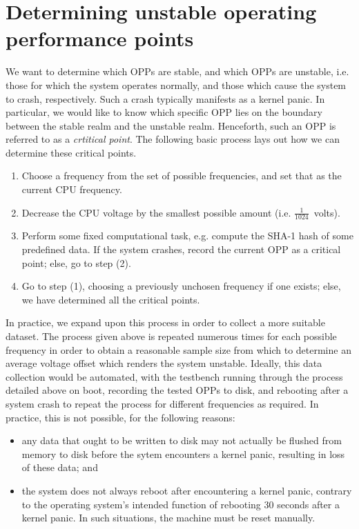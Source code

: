 \section{Determining unstable operating performance points}
\label{sec:unstableOPPs}

We want to determine which OPPs are stable, and which OPPs are unstable, i.e.
those for which the system operates normally, and those which cause the system
to crash, respectively. Such a crash typically manifests as a kernel panic.
In particular, we would like to know which specific OPP lies on the boundary
between the stable realm and the unstable realm. Henceforth, such an OPP is
referred to as a \emph{crtitical point}. The following basic process lays out
how we can determine these critical points.

\begin{enumerate}
    \item Choose a frequency from the set of possible frequencies, and set that
        as the current CPU frequency.
    \item Decrease the CPU voltage by the smallest possible amount
        (i.e. $\frac{1}{1024}$~volts).
    \item Perform some fixed computational task, e.g. compute the SHA-1 hash of
        some predefined data. If the system crashes, record the current
        OPP as a critical point; else, go to step (2).
    \item Go to step (1), choosing a previously unchosen frequency if one
        exists; else, we have determined all the critical points.
\end{enumerate}

In practice, we expand upon this process in order to collect a more suitable
dataset. The process given above is repeated numerous times for each possible
frequency in order to obtain a reasonable sample size from which to determine
an average voltage offset which renders the system unstable. Ideally, this data
collection would be automated, with the testbench running through the process
detailed above on boot, recording the tested OPPs to disk, and rebooting after
a system crash to repeat the process for different frequencies as required. In
practice, this is not possible, for the following reasons:

\begin{itemize}
    \item any data that ought to be written to disk may not actually be flushed
        from memory to disk before the sytem encounters a kernel panic, 
        resulting in loss of these data; and
    \item the system does not always reboot after encountering a kernel panic,
        contrary to the operating system's intended function of rebooting 30
        seconds after a kernel panic. In such situations, the machine must be
        reset manually.
\end{itemize}

